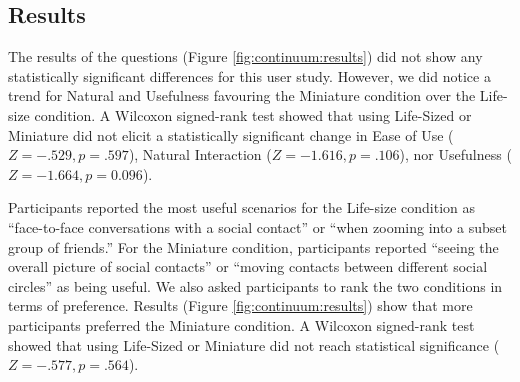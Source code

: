 \subsection{Results}

The results of the questions (Figure \ref{fig:continuum:results}) did not show any statistically significant differences for this user study. However, we did notice a trend for Natural and Usefulness favouring the Miniature condition over the Life-size condition. A Wilcoxon signed-rank test showed that using Life-Sized or Miniature did not elicit a statistically significant change in Ease of Use ($Z=-.529, p=.597$), Natural Interaction ($Z=-1.616, p=.106$), nor Usefulness ($Z=-1.664, p=0.096$). 

Participants reported the most useful scenarios for the Life-size condition as \enquote{face-to-face conversations with a social contact} or \enquote{when zooming into a subset group of friends.} For the Miniature condition, participants reported \enquote{seeing the overall picture of social contacts} or \enquote{moving contacts between different social circles} as being useful. We also asked participants to rank the two conditions in terms of preference. Results (Figure \ref{fig:continuum:results}) show that more participants preferred the Miniature condition. A Wilcoxon signed-rank test showed that using Life-Sized or Miniature did not reach statistical significance ($Z=-.577, p=.564$).

